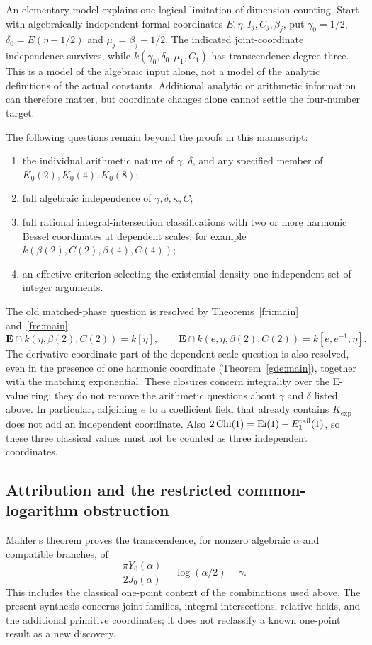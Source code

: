\documentclass[11pt]{article}
\theoremstyle{definition}
\theoremstyle{remark}
\newcommand{\Ebar}{\overline{\mathbf E}}
\newcommand{\Kexp}{K_{\mathrm{exp}}}
\begin{document}
An elementary model explains one logical limitation of dimension
counting. Start with algebraically independent formal coordinates
$E,\eta,I_j,C_j,\beta_j$, put $\gamma_0=1/2$,
$\delta_0=E(\eta-1/2)$ and $\mu_j=\beta_j-1/2$.
The indicated joint-coordinate independence survives, while
$k(\gamma_0,\delta_0,\mu_1,C_1)$ has transcendence degree three.
This is a model of the algebraic input alone, not a model of the analytic
definitions of the actual constants. Additional analytic or arithmetic
information can therefore matter, but coordinate changes alone cannot
settle the four-number target.

The following questions remain beyond the proofs in this manuscript:
\begin{enumerate}
\item the individual arithmetic nature of $\gamma$, $\delta$, and any
specified member of $K_0(2),K_0(4),K_0(8)$;
\item full algebraic independence of $\gamma,\delta,\kappa,C$;
\item full rational integral-intersection classifications with two or
more harmonic Bessel coordinates at dependent scales, for example
$k(\beta(2),C(2),\beta(4),C(4))$;
\item an effective criterion selecting the existential density-one
independent set of integer arguments.
\end{enumerate}
The old matched-phase question is resolved by Theorems~\ref{fri:main}
and~\ref{fre:main}:
\[
 \Ebar\cap k(\eta,\beta(2),C(2))=k[\eta],\qquad
 \Ebar\cap k(e,\eta,\beta(2),C(2))=k[e,e^{-1},\eta].
\]
The derivative-coordinate part of the dependent-scale question is also
resolved, even in the presence of one harmonic coordinate
(Theorem~\ref{gde:main}), together with the matching exponential.
These closures concern integrality over
the E-value ring; they do not remove the arithmetic questions about
$\gamma$ and $\delta$ listed above.
In particular, adjoining $e$ to a coefficient field that already contains
$\Kexp$ does not add an independent coordinate. Also
$2\operatorname{Chi}(1)=\operatorname{Ei}(1)-E_1^{\rm tail}(1)$,
so these three classical values must not be counted as three independent
coordinates.

\subsection{Attribution and the restricted common-logarithm obstruction}
Mahler's theorem \cite[Theorem 3 and p.~170]{Mahler} proves the
transcendence, for nonzero algebraic $\alpha$ and compatible branches, of
\[
 \frac{\pi Y_0(\alpha)}{2J_0(\alpha)}
          -\log(\alpha/2)-\gamma.
\]
This includes the classical one-point context of the combinations used
above. The present synthesis concerns joint families, integral
intersections, relative fields, and the additional primitive coordinates;
it does not reclassify a known one-point result as a new discovery.
\end{document}

